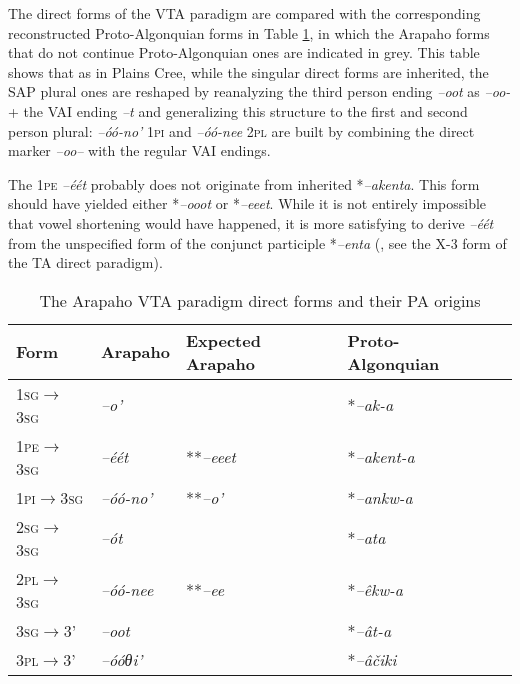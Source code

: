 \documentclass[twoside,a4paper,11pt]{article}
\newcommand{\ipa}[1]{{\phon\textit{#1}}}
\newcommand{\sg}{\textsc{sg}}
\newcommand{\pl}{\textsc{pl}}
\newcommand{\grise}[1]{\cellcolor{lightgray}\textbf{#1}}
\newcommand{\pli}{\textsc{pi}}
\newcommand{\pe}{\textsc{pe}}
\begin{document}
The direct forms of the VTA paradigm are compared with the corresponding reconstructed Proto-Algonquian forms in Table \ref{tab:arapaho.vta.1}, in which the Arapaho forms that do not continue Proto-Algonquian ones are indicated in grey. This table shows that as in Plains Cree, while the singular direct forms are inherited, the SAP plural ones are reshaped by reanalyzing the third person ending \ipa{--oot} as \ipa{--oo-} + the VAI ending \ipa{--t} and generalizing this structure to the first and second person plural: \ipa{--óó-no'} 1\pli{} and \ipa{--óó-nee} 2\pl{} are built by combining the direct marker \ipa{--oo--} with the regular VAI endings.

The 1\pe{} \ipa{--éét} probably does not originate from inherited  *\ipa{--akenta}. This form should have yielded  either *\ipa{--ooot} or *\ipa{--eeet}. While it is not entirely impossible that vowel shortening would have happened, it is more satisfying to derive  \ipa{--éét}  from the unspecified form of the conjunct participle  *\ipa{--enta} (\citealt[4]{goddard98morphology.arapaho}, see the X-3 form of the TA direct paradigm).

\begin{table}[H]
\caption{The Arapaho VTA paradigm direct forms and their PA origins}
\centering \label{tab:arapaho.vta.1}
\begin{tabular}{lllll}
\toprule
Form& Arapaho & Expected Arapaho & Proto-Algonquian \\
\midrule
 1\sg{}$\rightarrow$3\sg{} & 	\ipa{--o'} & 	 & 	*\ipa{--ak-a} & 		\\		
1\pe{}$\rightarrow$3\sg{} & 	\ipa{--éét}\grise{} & 	**\ipa{--eeet}&  *\ipa{--akent-a} & 		\\		
1\pli{}$\rightarrow$3\sg{} & 	\ipa{--óó-no'}\grise{} & 	**\ipa{--o'}& *\ipa{--ankw-a} & 		\\		
\midrule
2\sg{}$\rightarrow$3\sg{} & 	\ipa{--ót} && 	*\ipa{--ata} & 		\\		
2\pl{}$\rightarrow$3\sg{} & 	\ipa{--óó-nee} \grise{}& 	**\ipa{--ee}& *\ipa{--êkw-a} & 		\\		
\midrule
3\sg{}$\rightarrow$3' & 	\ipa{--oot} & 	&*\ipa{--ât-a} & 		\\		
3\pl{}$\rightarrow$3' & 	\ipa{--óóθi'} & &	*\ipa{--âčiki} & 		\\		
\bottomrule
\end{tabular}
\end{table}
\end{document}
